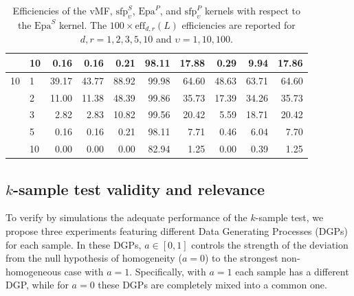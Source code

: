 \documentclass[oneside,11pt]{article}
\begin{document}
\begin{table}[htpb!]
\begin{tabular}{ll|rrrr|rrrr}
     & 10 & 0.16 & 0.16 & 0.21 & 98.11 & 17.88 & 0.29 & 9.94 & 17.86\\
    \midrule
    10 & 1 & 39.17 & 43.77 & 88.92 & 99.98 & 64.60 & 48.63 & 63.71 & 64.60\\
     & 2 & 11.00 & 11.38 & 48.39 & 99.86 & 35.73 & 17.39 & 34.26 & 35.73\\
     & 3 & 2.82 & 2.83 & 10.82 & 99.56 & 20.42 & 5.59 & 18.71 & 20.42\\
     & 5 & 0.16 & 0.16 & 0.21 & 98.11 & 7.71 & 0.46 & 6.04 & 7.70\\
     & 10 & 0.00 & 0.00 & 0.00 & 82.94 & 1.25 & 0.00 & 0.39 & 1.25\\
    \bottomrule
    \end{tabular}\caption{\small Efficiencies of the vMF, $\mathrm{sfp}_{\upsilon}^S$, $\mathrm{Epa}^P$, and $\mathrm{sfp}_{\upsilon}^P$ kernels with respect to the $\mathrm{Epa}^S$ kernel. The $100\times \mathrm{eff}_{d,r}(L)$ efficiencies are reported for $d,r=1,2,3,5,10$ and $\upsilon=1,10,100$.}
    \label{tab:effic}
\end{table}

\subsection{\texorpdfstring{$k$-sample test validity and relevance}{k-sample test validity and relevance}}

To verify by simulations the adequate performance of the $k$-sample test, we propose three experiments featuring different Data Generating Processes (DGPs) for each sample. In these DGPs, $a\in[0,1]$ controls the strength of the deviation from the null hypothesis of homogeneity ($a=0$) to the strongest non-homogeneous case with $a=1$. Specifically, with $a=1$ each sample has a different DGP, while for $a=0$ these DGPs are completely mixed into a common one.
\end{document}
